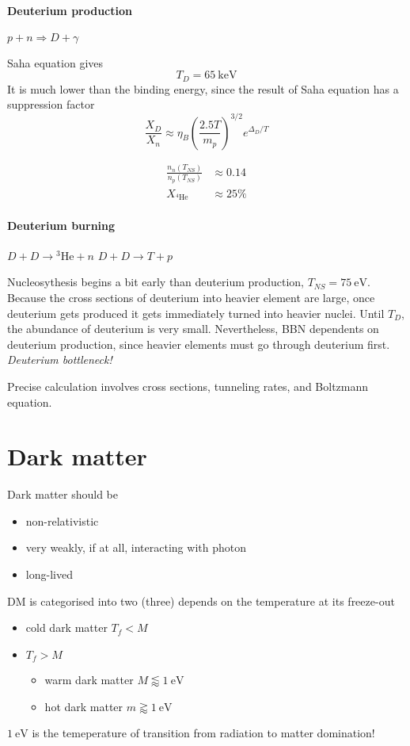 \documentclass[12pt, a4paper, DIV=15]{article}
\numberwithin{equation}{section}
\begin{document}
\paragraph{Deuterium production}
$p+n \Rightarrow D+\gamma$

Saha equation gives
\begin{equation}
   T_D = \SI{65}{\kilo\eV}
\end{equation}
It is much lower than the binding energy, since the result of Saha equation has a suppression factor
\begin{equation}
   \frac{X_D}{X_n} \approx \eta_B \left( \frac{2.5 T}{m_p} \right)^{3/2} e^{\Delta_D / T}
\end{equation}

\begin{align}
   \frac{n_n(T_{NS})}{n_p(T_{NS})} &\approx 0.14 \\
   X_{{}^4 \text{He}} &\approx 25 \%
\end{align}
\paragraph{Deuterium burning}
$D+ D \rightarrow {}^3 \text{He} + n$ $D + D \rightarrow T+ p$

Nucleosythesis begins a bit early than deuterium production, $T_{NS} = \SI{75}{\eV}$. Because the cross sections of deuterium into heavier element are large, once deuterium gets produced it gets immediately turned into heavier nuclei. Until $T_D$, the abundance of deuterium is very small. Nevertheless, BBN dependents on deuterium production, since heavier elements must go through deuterium first. \textit{Deuterium bottleneck!}

Precise calculation involves cross sections, tunneling rates, and Boltzmann equation.

\section{Dark matter}
Dark matter should be
\begin{itemize}
   \item non-relativistic
   \item very weakly, if at all, interacting with photon
   \item long-lived
\end{itemize}

DM is categorised into two (three) depends on the temperature at its freeze-out
\begin{itemize}
   \item cold dark matter $T_f < M$
   \item $T_f > M$
      \begin{itemize}
         \item warm dark matter $M \lessapprox \SI{1}{\eV}$
         \item hot dark matter $m \gtrapprox \SI{1}{\eV}$
      \end{itemize}
\end{itemize}
$\SI{1}{\eV}$ is the temeperature of transition from radiation to matter domination!
\end{document}
